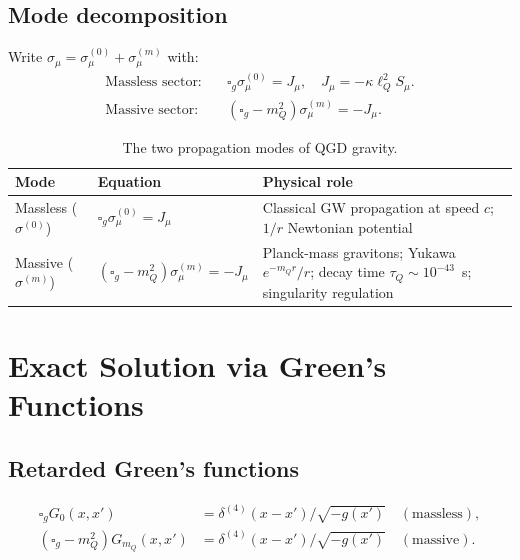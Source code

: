 \documentclass[11pt,a4paper]{article}
\theoremstyle{plain}
\theoremstyle{definition}
\theoremstyle{remark}
\newcommand{\lQ}{\ell_Q}
\newcommand{\mQ}{m_Q}
\newcommand{\boxg}{\square_g}
\begin{document}
\subsection{Mode decomposition}

Write $\sigma_\mu = \sigma_\mu^{(0)} + \sigma_\mu^{(m)}$ with:
\begin{align}
  \text{Massless sector:}&\quad \boxg\sigma_\mu^{(0)} = J_\mu,
    \quad J_\mu = -\kappa\lQ^2 S_\mu.
    \label{eq:massless}\\
  \text{Massive sector:}&\quad (\boxg - \mQ^2)\sigma_\mu^{(m)} = -J_\mu.
    \label{eq:massive}
\end{align}

\begin{table}[h]
\centering
\renewcommand{\arraystretch}{1.35}
\begin{tabular}{@{}p{3.2cm}p{4.5cm}p{5.5cm}@{}}
\toprule
Mode & Equation & Physical role \\
\midrule
Massless ($\sigma^{(0)}$) & $\boxg\sigma_\mu^{(0)} = J_\mu$ &
  Classical GW propagation at speed $c$; $1/r$ Newtonian potential \\
Massive ($\sigma^{(m)}$) & $(\boxg-\mQ^2)\sigma_\mu^{(m)} = -J_\mu$ &
  Planck-mass gravitons; Yukawa $e^{-\mQ r}/r$; decay time $\tau_Q\sim10^{-43}$~s;
  singularity regulation \\
\bottomrule
\end{tabular}
\caption{The two propagation modes of QGD gravity.}
\end{table}

\section{Exact Solution via Green's Functions}
\label{sec:green}

\subsection{Retarded Green's functions}

\begin{align}
  \boxg G_0(x,x') &= \delta^{(4)}(x-x')/\sqrt{-g(x')}
    \quad(\text{massless}), \label{eq:G0def}\\
  (\boxg - \mQ^2)G_{\mQ}(x,x') &= \delta^{(4)}(x-x')/\sqrt{-g(x')}
    \quad(\text{massive}). \label{eq:GmQdef}
\end{align}
\end{document}
